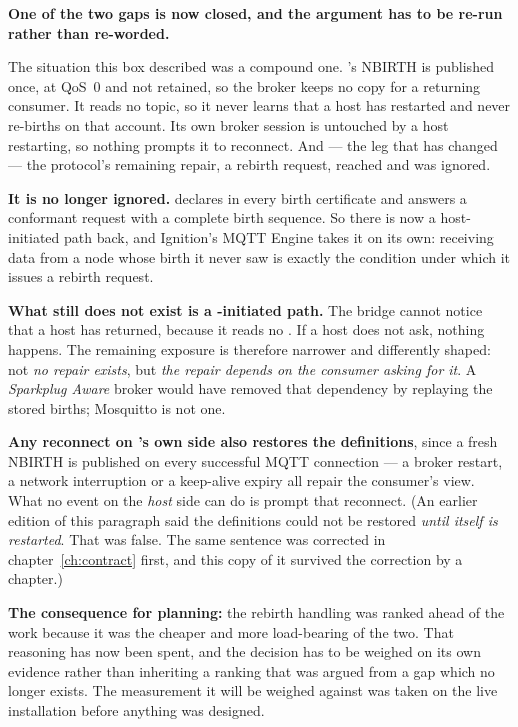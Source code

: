\begin{warning}
\textbf{One of the two gaps is now closed, and the argument has to be re-run rather than
re-worded.}

The situation this box described was a compound one. \prog's NBIRTH is published once, at
QoS~0 and not retained, so the broker keeps no copy for a returning consumer. It reads no
 topic, so it never learns that a host has restarted and never re-births on
that account. Its own broker session is untouched by a host restarting, so nothing prompts
it to reconnect. And --- the leg that has changed --- the protocol's remaining repair, a
rebirth request, reached \prog and was ignored.

\textbf{It is no longer ignored.} \prog declares  in every birth
certificate and answers a conformant request with a complete birth sequence. So there is now
a host-initiated path back, and Ignition's MQTT Engine takes it on its own: receiving data
from a node whose birth it never saw is exactly the condition under which it issues a
rebirth request.

\textbf{What still does not exist is a \prog-initiated path.} The bridge cannot notice that
a host has returned, because it reads no . If a host does not ask, nothing
happens. The remaining exposure is therefore narrower and differently shaped: not \emph{no
repair exists}, but \emph{the repair depends on the consumer asking for it}. A
\emph{Sparkplug Aware} broker would have removed that dependency by replaying the stored
births; Mosquitto is not one.

\textbf{Any reconnect on \prog's own side also restores the definitions}, since a fresh
NBIRTH is published on every successful MQTT connection --- a broker restart, a network
interruption or a keep-alive expiry all repair the consumer's view. What no event on the
\emph{host} side can do is prompt that reconnect. (An earlier edition of this paragraph
said the definitions could not be restored \emph{until \prog itself is restarted}. That was
false. The same sentence was corrected in chapter~\ref{ch:contract} first, and this copy of
it survived the correction by a chapter.)

\textbf{The consequence for planning:} the rebirth handling was ranked ahead of the
 work because it was the cheaper and more load-bearing of the two. That
reasoning has now been spent, and the  decision has to be weighed on its own
evidence rather than inheriting a ranking that was argued from a gap which no longer
exists. The measurement it will be weighed against was taken on the live installation
before anything was designed.
\end{warning}

